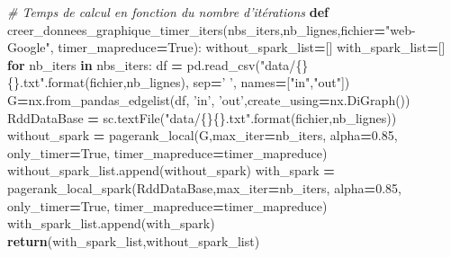 \documentclass[10pt,a4paper]{article}
\newenvironment{Shaded}{\begin{snugshade}}{\end{snugshade}}
\newcommand{\BuiltInTok}[1]{#1}
\newcommand{\CommentTok}[1]{\textcolor[rgb]{0.56,0.35,0.01}{\textit{#1}}}
\newcommand{\ControlFlowTok}[1]{\textcolor[rgb]{0.13,0.29,0.53}{\textbf{#1}}}
\newcommand{\FloatTok}[1]{\textcolor[rgb]{0.00,0.00,0.81}{#1}}
\newcommand{\KeywordTok}[1]{\textcolor[rgb]{0.13,0.29,0.53}{\textbf{#1}}}
\newcommand{\NormalTok}[1]{#1}
\newcommand{\OperatorTok}[1]{\textcolor[rgb]{0.81,0.36,0.00}{\textbf{#1}}}
\newcommand{\SpecialCharTok}[1]{\textcolor[rgb]{0.00,0.00,0.00}{#1}}
\newcommand{\StringTok}[1]{\textcolor[rgb]{0.31,0.60,0.02}{#1}}
\newcommand{\VariableTok}[1]{\textcolor[rgb]{0.00,0.00,0.00}{#1}}
\theoremstyle{break}
\begin{document}
\begin{Shaded}
\begin{Highlighting}[]
\CommentTok{# Temps de calcul en fonction du nombre d'itérations}
\KeywordTok{def}\NormalTok{ creer_donnees_graphique_timer_iters(nbs_iters,nb_lignes,fichier}\OperatorTok{=}\StringTok{"web-Google"}\NormalTok{,}
\NormalTok{                                         timer_mapreduce}\OperatorTok{=}\VariableTok{True}\NormalTok{):}
\NormalTok{    without_spark_list}\OperatorTok{=}\NormalTok{[]}
\NormalTok{    with_spark_list}\OperatorTok{=}\NormalTok{[]}
    \ControlFlowTok{for}\NormalTok{ nb_iters }\KeywordTok{in}\NormalTok{ nbs_iters: }
\NormalTok{        df }\OperatorTok{=}\NormalTok{ pd.read_csv(}\StringTok{"data/}\SpecialCharTok{\{\}\{\}}\StringTok{.txt"}\NormalTok{.}\BuiltInTok{format}\NormalTok{(fichier,nb_lignes),}
\NormalTok{                     sep}\OperatorTok{=}\StringTok{' '}\NormalTok{, names}\OperatorTok{=}\NormalTok{[}\StringTok{"in"}\NormalTok{,}\StringTok{"out"}\NormalTok{])}
\NormalTok{        G}\OperatorTok{=}\NormalTok{nx.from_pandas_edgelist(df, }\StringTok{'in'}\NormalTok{, }\StringTok{'out'}\NormalTok{,create_using}\OperatorTok{=}\NormalTok{nx.DiGraph())}
\NormalTok{        RddDataBase }\OperatorTok{=}\NormalTok{ sc.textFile(}\StringTok{"data/}\SpecialCharTok{\{\}\{\}}\StringTok{.txt"}\NormalTok{.}\BuiltInTok{format}\NormalTok{(fichier,nb_lignes))}
\NormalTok{        without_spark }\OperatorTok{=}\NormalTok{ pagerank_local(G,max_iter}\OperatorTok{=}\NormalTok{nb_iters,}
\NormalTok{                                            alpha}\OperatorTok{=}\FloatTok{0.85}\NormalTok{, only_timer}\OperatorTok{=}\VariableTok{True}\NormalTok{,}
\NormalTok{                                         timer_mapreduce}\OperatorTok{=}\NormalTok{timer_mapreduce)}
\NormalTok{        without_spark_list.append(without_spark)}
\NormalTok{        with_spark }\OperatorTok{=}\NormalTok{ pagerank_local_spark(RddDataBase,max_iter}\OperatorTok{=}\NormalTok{nb_iters,}
\NormalTok{                                               alpha}\OperatorTok{=}\FloatTok{0.85}\NormalTok{, only_timer}\OperatorTok{=}\VariableTok{True}\NormalTok{,}
\NormalTok{                                         timer_mapreduce}\OperatorTok{=}\NormalTok{timer_mapreduce)}
\NormalTok{        with_spark_list.append(with_spark)}
    \ControlFlowTok{return}\NormalTok{(with_spark_list,without_spark_list)}


\end{Highlighting}
\end{Shaded}
\end{document}
